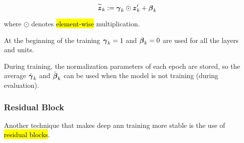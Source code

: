 \begin{equation}
    \overset{\sim}{\boldsymbol{z}}_k := \boldsymbol{\gamma}_k \odot \boldsymbol{z}'_k + \boldsymbol{\beta}_k
\end{equation}

\noindent where $\odot$ denotes \hl{element-wise} multiplication.

At the beginning of the training $\boldsymbol{\gamma}_k=1$ and $\boldsymbol{\beta}_k=0$ are used for all the layers and units.

During training, the normalization parameters of each epoch are stored, so the average $\bar{\boldsymbol{\gamma}}_k$ and $\bar{\boldsymbol{\beta}}_k$ can be used when the model is not training (during evaluation).

\subsubsection{Residual Block}

Another technique that makes deep \gls{ann} training more stable is the use of \hl{residual blocks}.
